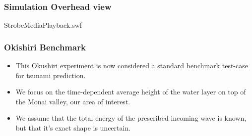 \documentclass[11pt,ucs]{beamer}
\begin{document}
\begin{frame}\frametitle{Simulation Overhead view}

\begin{center}
   {StrobeMediaPlayback.swf}
\end{center}

\end{frame}





\begin{frame}\frametitle{Okishiri Benchmark}
 
\begin{itemize}

\item This Okushiri experiment is now considered a standard benchmark test-case for tsunami prediction. 

\item We focus on the time-dependent average height of the water layer on top of the Monai valley, our area of interest. 

\item We assume that the total energy of the prescribed incoming wave is known, but that it's exact shape is uncertain.
\end{itemize}

\end{frame}
\end{document}
